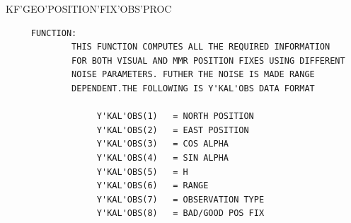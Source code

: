 \begin{frame}
KF'GEO'POSITION'FIX'OBS'PROC
\begin{verbatim}
     FUNCTION:
             THIS FUNCTION COMPUTES ALL THE REQUIRED INFORMATION
             FOR BOTH VISUAL AND MMR POSITION FIXES USING DIFFERENT
             NOISE PARAMETERS. FUTHER THE NOISE IS MADE RANGE
             DEPENDENT.THE FOLLOWING IS Y'KAL'OBS DATA FORMAT
 
                  Y'KAL'OBS(1)   = NORTH POSITION
                  Y'KAL'OBS(2)   = EAST POSITION
                  Y'KAL'OBS(3)   = COS ALPHA
                  Y'KAL'OBS(4)   = SIN ALPHA
                  Y'KAL'OBS(5)   = H
                  Y'KAL'OBS(6)   = RANGE
                  Y'KAL'OBS(7)   = OBSERVATION TYPE
                  Y'KAL'OBS(8)   = BAD/GOOD POS FIX
 
\end{verbatim}
\end{frame}
